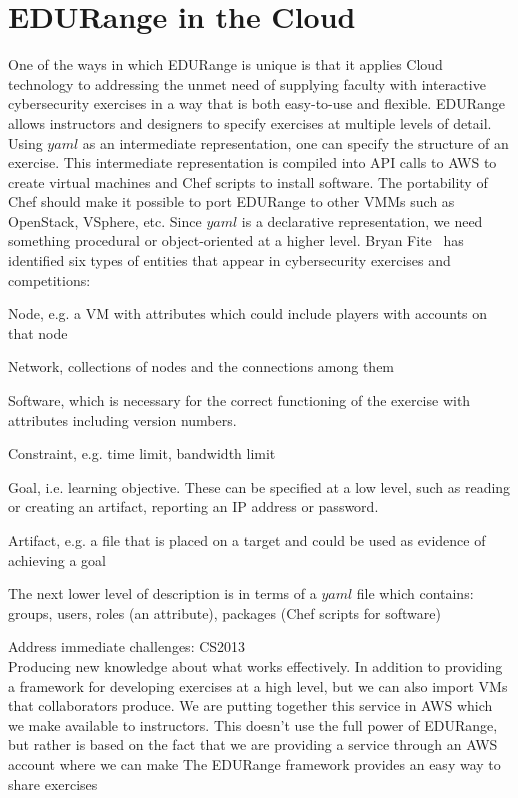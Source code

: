\section*{EDURange in the Cloud}
One of the ways in which EDURange is unique is that it applies Cloud technology 
to addressing the unmet need of supplying faculty with interactive cybersecurity exercises 
in a way that is both easy-to-use and flexible.
EDURange allows instructors and designers to specify exercises at multiple levels of detail.
Using $yaml$ as an intermediate representation, one can specify the structure of an exercise.
This intermediate representation is compiled into API calls to AWS to create virtual machines and
Chef scripts to install software. The portability of Chef should make it possible to port EDURange to
other VMMs such as OpenStack, VSphere, etc.
Since $yaml$ is a declarative representation, 
we need something procedural or object-oriented  at a higher level.  Bryan Fite~\cite{fite_2013} has identified
six types of entities that appear in cybersecurity exercises and competitions:
\begin{packenum}
  \item Node, e.g.  a VM with attributes which  could include players with accounts on that node
  \item Network,  collections of nodes and the connections among them
  \item Software, which is necessary for the correct functioning of the exercise
    with attributes including version numbers.
  \item Constraint, e.g. time limit, bandwidth limit
  \item Goal, i.e. learning objective.  These can be specified at a low level, such as 
    reading or creating an artifact, reporting an IP address or password.
  \item Artifact, e.g. a file that is placed on a target and could be used as evidence of achieving a goal
\end{packenum}

The next lower level of description is in terms of a $yaml$ file which contains:
 groups, users, roles (an attribute), packages (Chef scripts for software)

Address immediate challenges: CS2013\\

Producing new knowledge about what works effectively.  
In addition to providing a framework for developing exercises at a high level, but we can also 
import VMs that collaborators produce.  We are putting together this service in AWS which we make available
to instructors.  This doesn't use the full power of EDURange, but rather is based on the fact that we
are providing a service through an AWS account where we can make 
The EDURange framework provides an easy way to share exercises 

